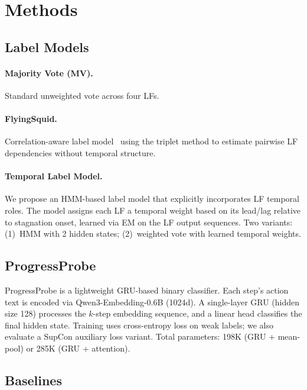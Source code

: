\documentclass[11pt,a4paper]{article}
\begin{document}
\section{Methods}

\subsection{Label Models}
\label{sec:label-models}

\paragraph{Majority Vote (MV).} Standard unweighted vote across four LFs.

\paragraph{FlyingSquid.} Correlation-aware label model~\cite{fu2020fast} using the triplet method to estimate pairwise LF dependencies without temporal structure.

\paragraph{Temporal Label Model.} We propose an HMM-based label model that explicitly incorporates LF temporal roles.
The model assigns each LF a temporal weight based on its lead/lag relative to stagnation onset, learned via EM on the LF output sequences.
Two variants: (1)~HMM with 2 hidden states; (2)~weighted vote with learned temporal weights.

\subsection{ProgressProbe}

ProgressProbe is a lightweight GRU-based binary classifier.
Each step's action text is encoded via Qwen3-Embedding-0.6B (1024d).
A single-layer GRU (hidden size 128) processes the $k$-step embedding sequence, and a linear head classifies the final hidden state.
Training uses cross-entropy loss on weak labels; we also evaluate a SupCon auxiliary loss variant.
Total parameters: 198K (GRU + mean-pool) or 285K (GRU + attention).

\subsection{Baselines}
\end{document}
